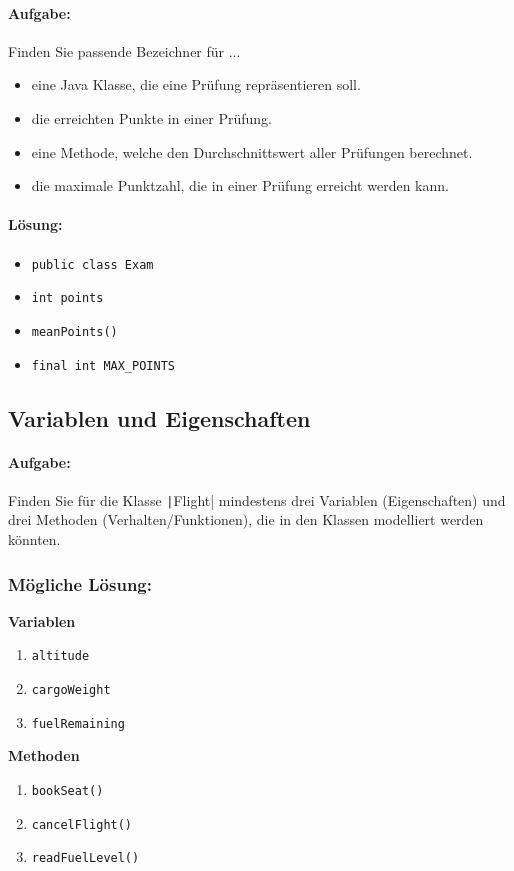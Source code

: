 \documentclass[a4paper,10pt, dvipsnames]{report}
\begin{document}
\paragraph{Aufgabe:}
Finden Sie passende Bezeichner für ...
\begin{itemize}
    \item eine Java Klasse, die eine Prüfung repräsentieren soll.
    \item die erreichten Punkte in einer Prüfung.
    \item eine Methode, welche den Durchschnittswert aller Prüfungen berechnet.
    \item die maximale Punktzahl, die in einer Prüfung erreicht werden kann.
\end{itemize}

\paragraph{Lösung:}
\begin{itemize}
    \item \texttt{public class Exam {}}
    \item \texttt{int points}
    \item \texttt{meanPoints()}
    \item \texttt{final int MAX_POINTS}
\end{itemize}

\subsection{Variablen und Eigenschaften}

\paragraph{Aufgabe:}
Finden Sie für die Klasse \texttt|Flight| mindestens drei Variablen (Eigenschaften) und drei Methoden (Verhalten/Funktionen), die in den Klassen modelliert werden könnten.

\subsubsection{Mögliche Lösung:}
\textbf{Variablen}
\begin{enumerate}
    \item \texttt{altitude}
    \item \texttt{cargoWeight}
    \item \texttt{fuelRemaining}
\end{enumerate}
\textbf{Methoden}
\begin{enumerate}
    \item \texttt{bookSeat()}
    \item \texttt{cancelFlight()}
    \item \texttt{readFuelLevel()}
\end{enumerate}
\end{document}
